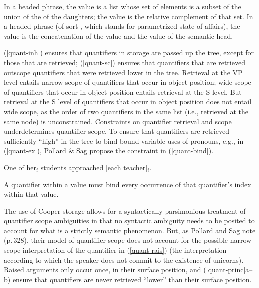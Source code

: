 \documentclass[output=paper]{langsci/langscibook}
\begin{document}
\eal \label{quant-princ}
\ex\label{quant-inh}
In a headed phrase, the  value is a list whose set of elements is a subset of the union of the  of the daughters; the  value is the relative complement of that set.
\ex\label{quant-sc}
In a headed phrase (of sort , which stands for parametrized state of affairs), the  value is the concatenation of the  value and the  value of the semantic head.
\zl


(\ref{quant-inh}) ensures that quantifiers in storage are passed up the tree, except for those that are retrieved; (\ref{quant-sc}) ensures that quantifiers that are retrieved outscope quantifiers that were retrieved lower in the tree. Retrieval at the VP level entails narrow scope of quantifiers that occur in object position; wide scope of quantifiers that occur in object position entails retrieval at the S level. But retrieval at the S level of quantifiers that occur in object position does not entail wide scope, as the order of two quantifiers in the same  list (i.e., retrieved at the same node) is unconstrained. Constraints on quantifier retrieval and scope underdetermines quantifier scope. To ensure that quantifiers are retrieved sufficiently ``high'' in the tree to bind bound variable uses of pronouns, e.g.,  in (\ref{quant-ex}), Pollard \& Sag propose the constraint in (\ref{quant-bind}).

\begin{exe}
\ex\label{quant-ex}
One of her$_{i}$ students approached [each teacher]$_{i}$. \citep[ex.27a]{PollardandSag1994}
\end{exe}

\begin{exe}
\ex\label{quant-bind}A quantifier within a  value must bind every occurrence of that quantifier's index within that  value.  
\end{exe}

The use of Cooper storage allows for a syntactically parsimonious treatment of quantifier scope ambiguities in that no syntactic ambiguity needs to be posited to account for what is a strictly semantic phenomenon. But, as Pollard and Sag note (p.\,328), their model of quantifier scope does not account for the possible narrow scope interpretation of the quantifier  in (\ref{quant-rais}) (the interpretation according to which the speaker does not commit to the existence of unicorns). Raised arguments only occur once, in their surface position, and (\ref{quant-princ}a--b) ensure that quantifiers are never retrieved ``lower'' than their surface position.
\end{document}
